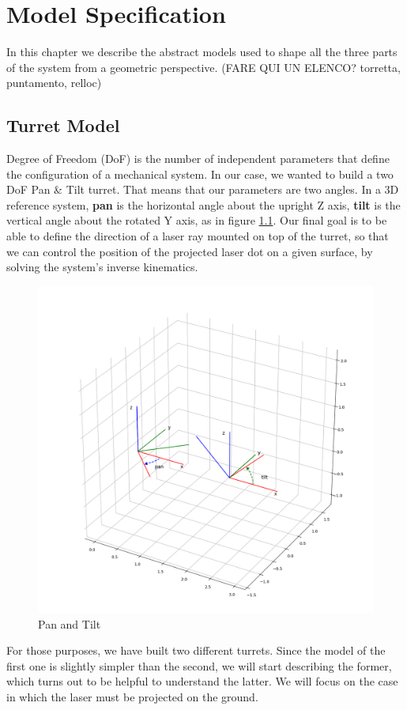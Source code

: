\chapter{Model Specification}
\label{chap:1} 
In this chapter we describe the abstract models used to shape all the three parts of the system from a geometric perspective. (FARE QUI UN ELENCO? torretta, puntamento, relloc)
\section{Turret Model}
\label{sec:1.1}
Degree of Freedom (DoF) is the number of independent parameters that define the configuration of a mechanical system. In our case, we wanted to build a two DoF Pan \& Tilt turret. That means that our parameters are two angles. In a 3D reference system, \textbf{pan} is the horizontal angle about the upright Z axis, \textbf{tilt} is the vertical angle about the rotated Y axis, as in figure \ref{fig:panTilt}.
Our final goal is to be able to define the direction of a laser ray mounted on top of the turret, so that we can control the position of the projected laser dot on a given surface, by solving the system's inverse kinematics.\\
\begin{figure}
	\centering
	\includegraphics[width=\textwidth]{img/panTilt.png}%
	\caption{Pan and Tilt}
	\label{fig:panTilt}
\end{figure}
For those purposes, we have built two different turrets. Since the model of the first one is slightly simpler than the second, we will start describing the former, which turns out to be helpful to understand the latter. We will focus on the case in which the laser must be projected on the ground.

